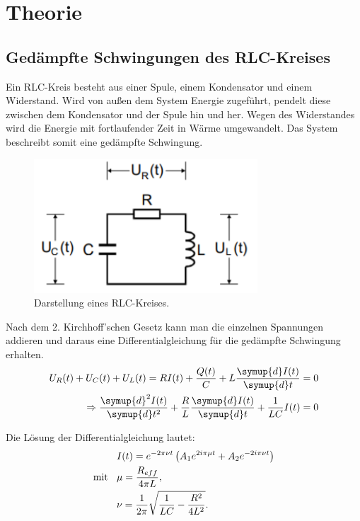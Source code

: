 \section{Theorie}
\label{sec:Theorie}

\subsection{Gedämpfte Schwingungen des RLC-Kreises}
Ein RLC-Kreis besteht aus einer Spule, einem Kondensator und einem Widerstand. Wird von außen
dem System Energie zugeführt, pendelt diese zwischen dem Kondensator und der Spule hin und her.
Wegen des Widerstandes wird die Energie mit fortlaufender Zeit in Wärme umgewandelt. Das System beschreibt
somit eine gedämpfte Schwingung.

\begin{figure}[H]
  \centering
  \includegraphics[height=5cm]{RLC-Kreis(Grundsaetzlich).PNG}
  \caption{Darstellung eines RLC-Kreises. \cite{sample}}
  \label{fig:RLC-Kreis(mit Widerstand)}
\end{figure}

Nach dem 2. Kirchhoff'schen Gesetz kann man die einzelnen Spannungen addieren und daraus eine Differentialgleichung
für die gedämpfte Schwingung erhalten.
\begin{align}
  U_R(t) + U_C(t) + U_L(t) = RI(t) +\frac{Q(t)}{C} + L\frac{\symup{d}I(t)}{\symup{d}t} = 0 \\
  \Rightarrow \frac{\symup{d}^2I(t)}{\symup{d}t^2} +\frac{R}{L}\frac{\symup{d}I(t)}{\symup{d}t} + \frac{1}{LC}I(t) = 0
\end{align}

Die Lösung der Differentialgleichung lautet:
\begin{align}
  &I(t) = e^{-2\pi \nu t} \left(A_1 e^{2i\pi \mu t} + A_2 e^{-2i\pi \nu t}\right)   \\
\text{mit} \:\:\:\:  &\mu = \frac{R_{eff}}{4\pi L} , \\
  &\nu = \frac{1}{2\pi} \sqrt{\frac{1}{LC} - \frac{R^2}{4L^2}} \notag.
\end{align}

